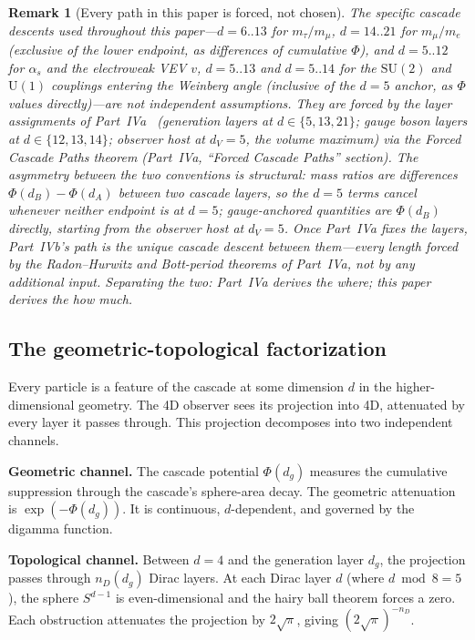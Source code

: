 \documentclass[12pt,a4paper]{article}
\newtheorem*{remark}{Remark}
\begin{document}
\begin{remark}[Every path in this paper is forced, not chosen]\label{rem:paths-forced}
The specific cascade descents used throughout this paper---$d=6..13$ for $m_\tau/m_\mu$, $d=14..21$ for $m_\mu/m_e$ (exclusive of the lower endpoint, as differences of cumulative $\Phi$), and $d=5..12$ for $\alpha_s$ and the electroweak VEV $v$, $d=5..13$ and $d=5..14$ for the $\mathrm{SU}(2)$ and $\mathrm{U}(1)$ couplings entering the Weinberg angle (inclusive of the $d=5$ anchor, as $\Phi$ values directly)---are not independent assumptions. They are forced by the layer assignments of Part~IVa~\cite{part4a} (generation layers at $d\in\{5,13,21\}$; gauge boson layers at $d\in\{12,13,14\}$; observer host at $d_V=5$, the volume maximum) via the \emph{Forced Cascade Paths} theorem (Part~IVa, ``Forced Cascade Paths'' section). The asymmetry between the two conventions is structural: mass ratios are differences $\Phi(d_B)-\Phi(d_A)$ between two cascade layers, so the $d=5$ terms cancel whenever neither endpoint is at $d=5$; gauge-anchored quantities are $\Phi(d_B)$ directly, starting from the observer host at $d_V=5$. Once Part~IVa fixes the layers, Part~IVb's path is the unique cascade descent between them---every length forced by the Radon--Hurwitz and Bott-period theorems of Part~IVa, not by any additional input. Separating the two: Part~IVa derives the \emph{where}; this paper derives the \emph{how much}.
\end{remark}

\subsection{The geometric-topological factorization}

Every particle is a feature of the cascade at some dimension $d$ in the higher-dimensional geometry. The 4D observer sees its projection into 4D, attenuated by every layer it passes through. This projection decomposes into two independent channels.

\textbf{Geometric channel.} The cascade potential $\Phi(d_g)$ measures the cumulative suppression through the cascade's sphere-area decay. The geometric attenuation is $\exp(-\Phi(d_g))$. It is continuous, $d$-dependent, and governed by the digamma function.

\textbf{Topological channel.} Between $d = 4$ and the generation layer $d_g$, the projection passes through $n_D(d_g)$ Dirac layers. At each Dirac layer $d$ (where $d \bmod 8 = 5$), the sphere $S^{d-1}$ is even-dimensional and the hairy ball theorem forces a zero. Each obstruction attenuates the projection by $2\sqrt{\pi}$, giving $(2\sqrt{\pi})^{-n_D}$.
\end{document}
